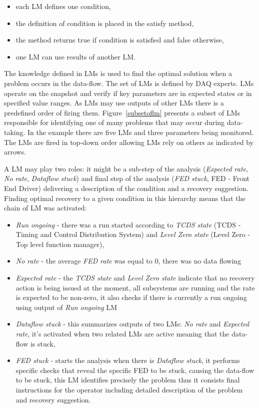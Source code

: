 \documentclass[a4paper]{jpconf}
\begin{document}
\begin{itemize}
\item each LM defines one condition,
\item the definition of condition is placed in the satisfy method,
\item the method returns true if condition is satisfied and false otherwise,
\item one LM can use results of another LM.
\end{itemize}

The knowledge defined in LMs is used to find the optimal solution when a problem occurs in the data-flow. The set of LMs is defined by DAQ experts. LMs operate on the snapshot and verify if key parameters are in expected states or in specified value ranges. As LMs may use outputs of other LMs there is a predefined order of firing them. Figure~\ref{subsetoflm} presents a subset of LMs responsible for identifying one of many problems that may occur during data-taking. In the example there are five LMs and three parameters being monitored. The LMs are fired in top-down order allowing LMs rely on others as indicated by arrows.


A LM may play two roles: it might be a sub-step of the analysis ({\it Expected rate}, {\it No rate}, {\it Dataflow stuck}) and final step of the analysis ({\it FED stuck}, FED - Front End Driver) delivering a description of the condition and a recovery suggestion. Finding optimal recovery to a given condition in this hierarchy means that the chain of LM was activated:

\begin{itemize}
\item {\it Run ongoing} -  there was a run started according to{ \it TCDS state} (TCDS - Timing and Control Distribution System) and{ \it Level Zero state} (Level Zero - Top level function manager),
\item{\it No rate} - the average {\it FED rate} was equal to 0, there was no data flowing
\item{\it Expected rate} - the {\it TCDS state}  and {\it Level Zero state} indicate that no recovery action is being issued at the moment, all subsystems are running and the rate is expected to be non-zero, it also checks if there is currently a run ongoing using output of {\it Run ongoing} LM
\item {\it Dataflow stuck} - this summarizes outputs of two LMs: {\it No rate} and {\it Expected rate}, it's activated when two related LMs are active meaning that the data-flow is stuck,
\item {\it FED stuck} - starts the analysis when there is {\it Dataflow stuck}, it performs specific checks that reveal the specific FED to be stuck, causing the data-flow to be stuck, this LM identifies precisely the problem thus it consists final instructions for the operator including detailed description of the problem and recovery suggestion.
\end{itemize}
\end{document}
